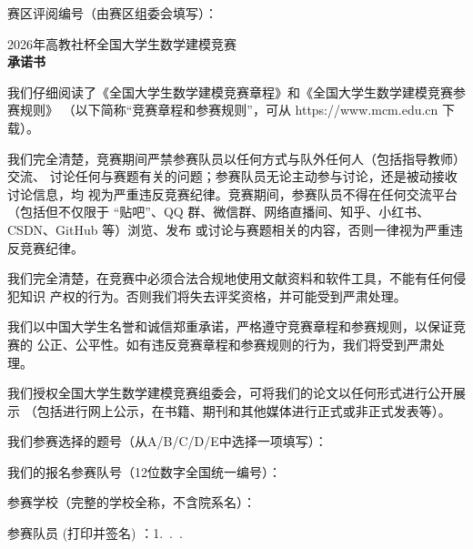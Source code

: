 \documentclass[12pt]{ctexart}
\begin{document}
\pagestyle{empty}

{\noindent 赛区评阅编号（由赛区组委会填写）：\uline{\hspace{6em}}}

\vspace{1em}
\begin{center}
    {\LARGE\heiti 2026年高教社杯全国大学生数学建模竞赛}\\[1em]
    {\huge\bfseries 承\hspace{1em}诺\hspace{1em}书}
\end{center}

\vspace{1em}
我们仔细阅读了《全国大学生数学建模竞赛章程》和《全国大学生数学建模竞赛参赛规则》
（以下简称“竞赛章程和参赛规则”，可从 https://www.mcm.edu.cn 下载）。

我们完全清楚，竞赛期间严禁参赛队员以任何方式与队外任何人（包括指导教师）交流、
讨论任何与赛题有关的问题；参赛队员无论主动参与讨论，还是被动接收讨论信息，均
视为严重违反竞赛纪律。竞赛期间，参赛队员不得在任何交流平台（包括但不仅限于
“贴吧”、QQ 群、微信群、网络直播间、知乎、小红书、CSDN、GitHub 等）浏览、发布
或讨论与赛题相关的内容，否则一律视为严重违反竞赛纪律。

我们完全清楚，在竞赛中必须合法合规地使用文献资料和软件工具，不能有任何侵犯知识
产权的行为。否则我们将失去评奖资格，并可能受到严肃处理。

我们以中国大学生名誉和诚信郑重承诺，严格遵守竞赛章程和参赛规则，以保证竞赛的
公正、公平性。如有违反竞赛章程和参赛规则的行为，我们将受到严肃处理。

我们授权全国大学生数学建模竞赛组委会，可将我们的论文以任何形式进行公开展示
（包括进行网上公示，在书籍、期刊和其他媒体进行正式或非正式发表等）。

\vspace{2em}
我们参赛选择的题号（从A/B/C/D/E中选择一项填写）：\uline{\hspace{4em}}

我们的报名参赛队号（12位数字全国统一编号）：\uline{\hspace{8em}}

参赛学校（完整的学校全称，不含院系名）：\uline{\hspace{8em}}

参赛队员 (打印并签名) ：1.~\uline{\hspace{5em}}.~\uline{\hspace{5em}}.~\uline{\hspace{5em}}
\end{document}

